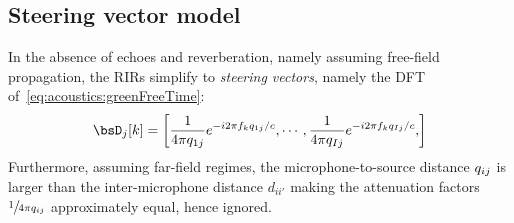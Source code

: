 \subsection{Steering vector model}\label{subsec:processing:steering}
In the absence of echoes and reverberation, namely assuming free-field propagation,
the \acp{RIR} simplify to \textit{steering vectors}, namely the \ac{DFT} of~\cref{eq:acoustics:greenFreeTime}:
\begin{equation}\label{eq:processing:steering}
    \bsD_{j}[k] = \klist{\frac{1}{4 \pi \distMicSrc_{1j}} \cste^{-\csti 2 \pi f_k \distMicSrc_{1j} / c},
                            \cdots,
                            \frac{1}{4 \pi \distMicSrc_{Ij}} \cste^{-\csti 2 \pi f_k \distMicSrc_{Ij} / c},
                    }
\end{equation}
Furthermore, assuming far-field regimes, the microphone-to-source distance $q_{ij}$ is larger than the
inter-microphone distance $d_{ii'}$ making the attenuation factors $\sfrac{1}{4 \pi q_{ij}}$ approximately equal, hence ignored.


